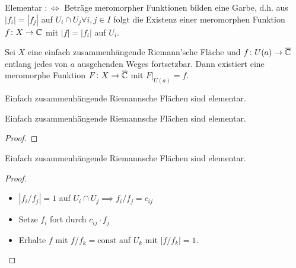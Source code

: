 \begin{frame}
    \begin{definition}
        Elementar $\colon\!\!\Leftrightarrow$ Beträge meromorpher Funktionen bilden eine Garbe, 
        d.h. aus $|f_i| = |f_j|$ auf $U_i \cap U_j \forall i, j \in I$ folgt die Existenz einer meromorphen Funktion $f \colon X \to \mathbb{C}$ mit $|f| = |f_i|$ auf $U_i$.
    \end{definition}
    \begin{theorem}[Monodromiesatz]
        Sei $X$ eine einfach zusammenhängende Riemann'sche Fläche und $f \colon U(a) \to \overline{\mathbb{C}}$ entlang jedes von $a$ ausgehenden Weges fortsetzbar. Dann existiert eine meromorphe Funktion $F\colon X \to \overline{\mathbb{C}}$ mit $F|_{U(a)} = f$.
    \end{theorem}
    \begin{lemma}
        Einfach zusammenhängende Riemannsche Flächen sind elementar.
    \end{lemma}
    
\end{frame}
\begin{frame}
    \begin{lemma}
        Einfach zusammenhängende Riemannsche Flächen sind elementar.
    \end{lemma}
    \begin{proof}
    \end{proof}
\end{frame}
\begin{frame}
    \begin{lemma}
        Einfach zusammenhängende Riemannsche Flächen sind elementar.
    \end{lemma}
    \begin{proof}
        \begin{itemize}
            \item $|f_i/f_j| = 1$ auf $U_i \cap U_j \implies f_i/f_j = c_{ij}$
            \item Setze $f_i$ fort durch $c_{ij} \cdot f_j$
            \item Erhalte $f$ mit $f/f_k = \mathrm{const}$ auf $U_k$ mit $|f/f_k| = 1$. 
        \end{itemize}
    \end{proof}
\end{frame}

